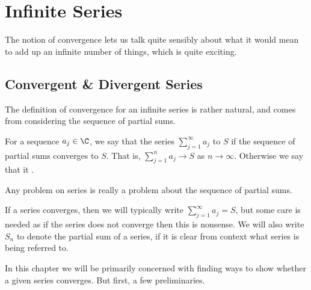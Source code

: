 \section{Infinite Series}\label{sec:2}

The notion of convergence lets us talk quite sensibly about what it would mean to add up an infinite number of things, which is quite exciting. 

\subsection{Convergent \& Divergent Series}

The definition of convergence for an infinite series is rather natural, and comes from considering the sequence of partial sums.


\begin{definition}
		For a sequence $a_j \in \C$, we say that the series $\sum_{j = 1}^{\infty} a_j$  to $S$ if the sequence of partial sums converges to $S$.
		That is, $\sum_{j = 1}^{n} a_j \rightarrow S$ as $n \rightarrow \infty$. Otherwise we say that it .
\end{definition}

\begin{remark}
	Any problem on series is really a problem about the sequence of partial sums.
\end{remark} 

\begin{remark}[Notation]
	If a series converges, then we will typically write $\sum_{j = 1}^{\infty} a_j = S$, but some care is needed as if the series does not converge then this is nonsense. 
	We will also write $S_n$ to denote the partial sum of a series, if it is clear from context what series is being referred to.
\end{remark}

In this chapter we will be primarily concerned with finding ways to show whether a given series converges. But first, a few preliminaries.

